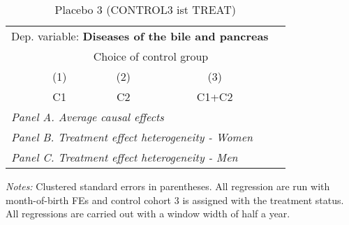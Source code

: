  \begin{table}[H] \centering \begin{threeparttable} \caption{Placebo 3 (CONTROL3 ist TREAT) } {\def\sym#1{\ifmmode^{#1}\else\(^{#1}\)\fi} \begin{tabular}{l*{4}{c}} \toprule \multicolumn{4}{l}{Dep. variable: \textbf{Diseases of the bile and pancreas}} \\ & \multicolumn{3}{c}{Choice of control group} \\ \cmidrule(lr){2-4}
            &\multicolumn{1}{c}{(1)}&\multicolumn{1}{c}{(2)}&\multicolumn{1}{c}{(3)}\\
            &\multicolumn{1}{c}{C1}&\multicolumn{1}{c}{C2}&\multicolumn{1}{c}{C1+C2}\\
\midrule
 \multicolumn{4}{l}{\emph{Panel A. Average causal effects}} \\      \midrule\multicolumn{4}{l}{\emph{Panel B. Treatment effect heterogeneity - Women}} \\      \midrule\multicolumn{4}{l}{\emph{Panel C. Treatment effect heterogeneity - Men}} \\      
\bottomrule \end{tabular} } \begin{tablenotes} \item \scriptsize \emph{Notes:} Clustered standard errors in parentheses. All regression are run with month-of-birth FEs and control cohort 3 is assigned with the treatment status. All regressions are carried out with a window width of half a year. \end{tablenotes} \end{threeparttable} \end{table} 
